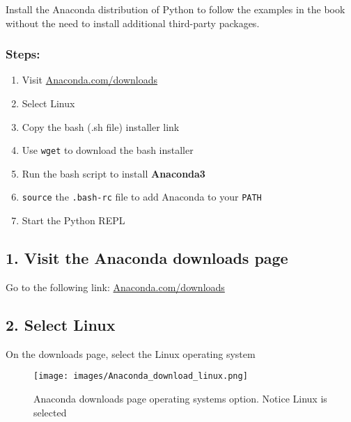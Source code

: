 \documentclass{book}
\makeatletter
\def\maxwidth{\ifdim\Gin@nat@width>\linewidth\linewidth
\else\Gin@nat@width\fi}
\let\Oldincludegraphics\includegraphics
\renewcommand{\includegraphics}[1]{\Oldincludegraphics[width=.8\maxwidth]{#1}}
\newcommand{\passthrough}[1]{#1}
\makeatother
\begin{document}
Install the Anaconda distribution of Python to follow the examples in
the book without the need to install additional third-party packages.
    




    
        \hypertarget{steps}{%
\subsubsection{Steps:}\label{steps}}

\begin{enumerate}
\def\labelenumi{\arabic{enumi}.}
\item
  Visit
  \href{https://www.anaconda.com/download/}{Anaconda.com/downloads}
\item
  Select Linux
\item
  Copy the bash (.sh file) installer link
\item
  Use \passthrough{\lstinline!wget!} to download the bash installer
\item
  Run the bash script to install \textbf{Anaconda3}
\item
  \passthrough{\lstinline!source!} the
  \passthrough{\lstinline!.bash-rc!} file to add Anaconda to your
  \passthrough{\lstinline!PATH!}
\item
  Start the Python REPL
\end{enumerate}
    




    
        \hypertarget{visit-the-anaconda-downloads-page}{%
\subsection{1. Visit the Anaconda downloads
page}\label{visit-the-anaconda-downloads-page}}

Go to the following link:
\href{https://www.anaconda.com/download/}{Anaconda.com/downloads}
    




    
        \hypertarget{select-linux}{%
\subsection{2. Select Linux}\label{select-linux}}

On the downloads page, select the Linux operating system

\begin{figure}
\centering
\texttt{[image: images/Anaconda\_download\_linux.png]}
\caption{Anaconda downloads page operating systems option. Notice Linux
is selected}
\end{figure}
    
\end{document}
